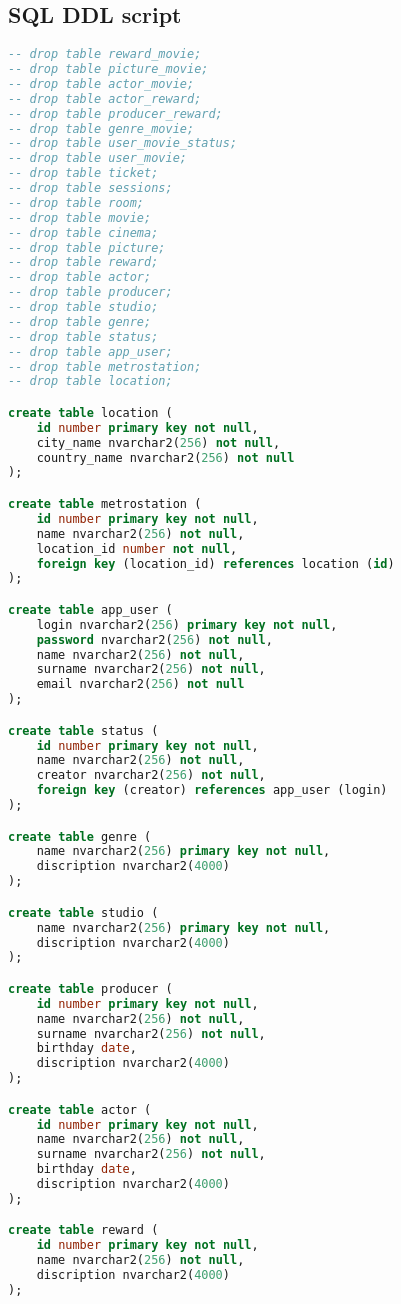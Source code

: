 \documentclass[a4paper,16pt]{article}
\begin{document}
\subsection{SQL DDL script}
\begin{lstlisting}[language=SQL]
-- drop table reward_movie;
-- drop table picture_movie;
-- drop table actor_movie;
-- drop table actor_reward;
-- drop table producer_reward;
-- drop table genre_movie;
-- drop table user_movie_status;
-- drop table user_movie;
-- drop table ticket;
-- drop table sessions;
-- drop table room;
-- drop table movie;
-- drop table cinema;
-- drop table picture;
-- drop table reward;
-- drop table actor;
-- drop table producer;
-- drop table studio;
-- drop table genre;
-- drop table status;
-- drop table app_user;
-- drop table metrostation;
-- drop table location;

create table location (
    id number primary key not null,
    city_name nvarchar2(256) not null,
    country_name nvarchar2(256) not null
);

create table metrostation (
    id number primary key not null,
    name nvarchar2(256) not null,
    location_id number not null,
    foreign key (location_id) references location (id)
);

create table app_user (
    login nvarchar2(256) primary key not null,
    password nvarchar2(256) not null,
    name nvarchar2(256) not null,
    surname nvarchar2(256) not null,
    email nvarchar2(256) not null
);

create table status (
    id number primary key not null,
    name nvarchar2(256) not null,
    creator nvarchar2(256) not null,
    foreign key (creator) references app_user (login)
);

create table genre (
    name nvarchar2(256) primary key not null,
    discription nvarchar2(4000)
);

create table studio (
    name nvarchar2(256) primary key not null,
    discription nvarchar2(4000)
);

create table producer (
    id number primary key not null,
    name nvarchar2(256) not null,
    surname nvarchar2(256) not null,
    birthday date,
    discription nvarchar2(4000)
);

create table actor (
    id number primary key not null,
    name nvarchar2(256) not null,
    surname nvarchar2(256) not null,
    birthday date,
    discription nvarchar2(4000)
);

create table reward (
    id number primary key not null,
    name nvarchar2(256) not null,
    discription nvarchar2(4000)
);


\end{lstlisting}
\end{document}
